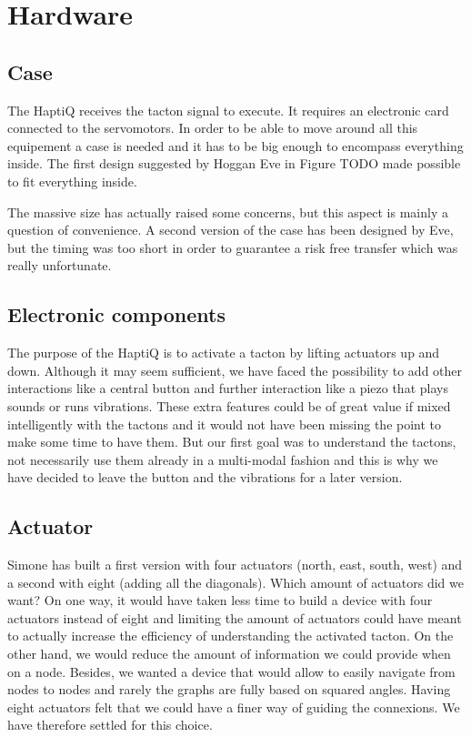 \section{Hardware}\label{design-of-the-hardware}

\subsection{Case}\label{case}

The HaptiQ receives the tacton signal to execute. It requires an electronic card connected to the servomotors. In order to be able to move around all this equipement a case is needed and it has to be big enough to encompass everything inside. The first design suggested by Hoggan Eve in Figure TODO made possible to fit everything inside. 

The massive size has actually raised some concerns, but this aspect is mainly a question of convenience. A second version of the case has been designed by Eve, but the timing was too short in order to guarantee a risk free transfer which was really unfortunate.

\subsection{Electronic components}

The purpose of the HaptiQ is to activate a tacton by lifting actuators up and down. Although it may seem sufficient, we have faced the possibility to add other interactions like a central button and further interaction like a piezo that plays sounds or runs vibrations. These extra features could be of great value if mixed intelligently with the tactons and it would not have been missing the point to make some time to have them. But our first goal was to understand the tactons, not necessarily use them already in a multi-modal fashion and this is why we have decided to leave the button and the vibrations for a later version.

\subsection{Actuator}\label{actuator-element}

Simone has built a first version with four actuators (north, east, south, west) and a second with eight (adding all the diagonals). Which amount of actuators did we want? On one way, it would have taken less time to build a device with four actuators instead of eight and limiting the amount of actuators could have meant to actually increase the efficiency of understanding the activated tacton. On the other hand, we would reduce the amount of information we could provide when on a node. Besides, we wanted a device that would allow to easily navigate from nodes to nodes and rarely the graphs are fully based on squared angles. Having eight actuators felt that we could have a finer way of guiding the connexions. We have therefore settled for this choice.

